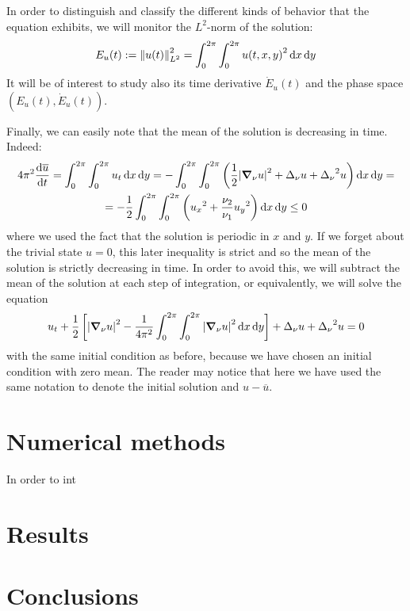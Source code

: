 \documentclass[twoside]{article}
\begin{document}
In order to distinguish and classify the different kinds of behavior that the equation exhibits, we will monitor the $L^2$-norm of the solution:
\begin{equation}
  E_u(t):=\left\|u(t)\right\|_{L^2}^2 = \int_0^{2\pi} \int_0^{2\pi} {u(t,x,y)}^2 \dd{x} \dd{y}
\end{equation}
It will be of interest to study also its time derivative $\dot{E}_u(t)$ and the phase space $(E_u(t), \dot{E}_u(t))$.

Finally, we can easily note that the mean of the solution is decreasing in time. Indeed:
\begin{multline}
  4\pi^2\dv{\overline{u}}{t}= \int_0^{2\pi} \int_0^{2\pi} u_t \dd{x} \dd{y} = -\int_0^{2\pi} \int_0^{2\pi} \left( \frac{1}{2} \abs{\grad_\nu u}^2 + \Delta_\nu u + {\Delta_\nu}^2 u \right) \dd{x} \dd{y} =\\= -\frac{1}{2}\int_0^{2\pi} \int_0^{2\pi} \left({u_x}^2 + \frac{\nu_2}{\nu_1} {u_y}^2\right) \dd{x} \dd{y} \leq 0
\end{multline}
where we used the fact that the solution is periodic in $x$ and $y$. If we forget about the trivial state $u=0$, this later inequality is strict and so the mean of the solution is strictly decreasing in time. In order to avoid this, we will subtract the mean of the solution at each step of integration, or equivalently, we will solve the equation
\begin{equation}
  u_t + \frac{1}{2} \left[\abs{\grad_\nu u}^2 - \frac{1}{4\pi^2}\int_0^{2\pi} \int_0^{2\pi} \abs{\grad_\nu u}^2 \dd{x} \dd{y} \right] + \Delta_\nu u + {\Delta_\nu}^2 u = 0
\end{equation}
with the same initial condition as before, because we have chosen an initial condition with zero mean. The reader may notice that here we have used the same notation to denote the initial solution and $u-\overline{u}$.
\section{Numerical methods}

In order to int

\section{Results}
\section{Conclusions}

{}
\printbibliography
\end{document}

